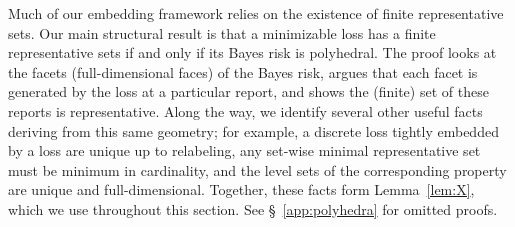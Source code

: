 \documentclass[twoside,11pt]{article}
\begin{document}
Much of our embedding framework relies on the existence of finite representative sets.
Our main structural result is that a minimizable loss has a finite representative sets if and only if its Bayes risk is polyhedral.
The proof looks at the facets (full-dimensional faces) of the Bayes risk, argues that each facet is generated by the loss at a particular report, and shows the (finite) set of these reports is representative.
Along the way, we identify several other useful facts deriving from this same geometry; for example, a discrete loss tightly embedded by a loss are unique up to relabeling, any set-wise minimal representative set must be minimum in cardinality, and the level sets of the corresponding property are unique and full-dimensional.
Together, these facts form Lemma~\ref{lem:X}, which we use throughout this section.
See \S~\ref{app:polyhedra} for omitted proofs.
\end{document}
